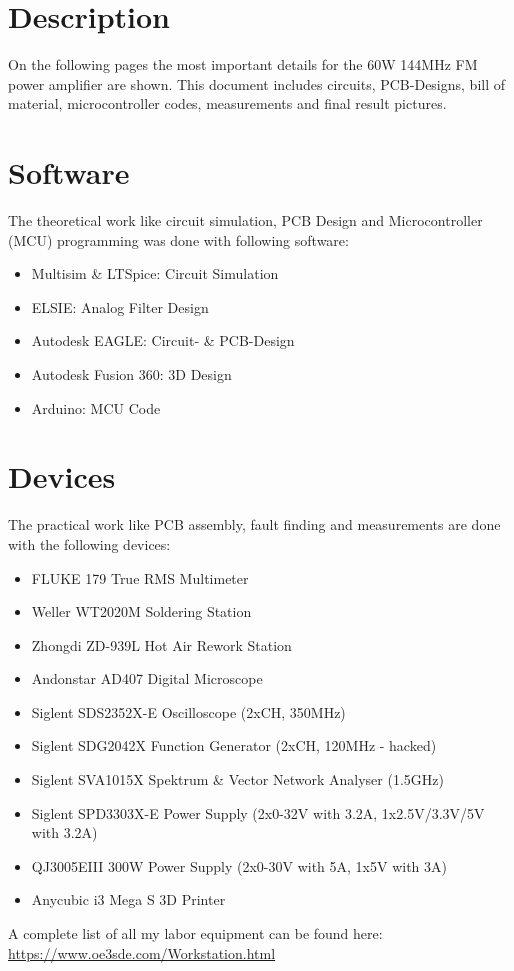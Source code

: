 \section{Description}
On the following pages the most important details for the 60W 144MHz FM power amplifier are shown. This document includes circuits, PCB-Designs, bill of material, microcontroller codes, measurements and final result pictures.

\section{Software}
The theoretical work like circuit simulation, PCB Design and Microcontroller (MCU) programming was done with following software:
\begin{itemize}
	\item Multisim \& LTSpice: Circuit Simulation
	\item ELSIE: Analog Filter Design
	\item Autodesk EAGLE: Circuit- \& PCB-Design
	\item Autodesk Fusion 360: 3D Design
	\item Arduino: MCU Code
\end{itemize}
\newpage
\section{Devices}
The practical work like PCB assembly, fault finding and measurements are done with the following devices:
\begin{itemize}
	\item FLUKE 179 True RMS Multimeter
	\item Weller WT2020M Soldering Station
	\item Zhongdi ZD-939L Hot Air Rework Station
	\item Andonstar AD407 Digital Microscope
	\item Siglent SDS2352X-E Oscilloscope (2xCH, 350MHz)
	\item Siglent SDG2042X Function Generator (2xCH, 120MHz - hacked)
	\item Siglent SVA1015X Spektrum \& Vector Network Analyser (1.5GHz)
	\item Siglent SPD3303X-E Power Supply (2x0-32V with 3.2A, 1x2.5V/3.3V/5V with 3.2A)
	\item QJ3005EIII 300W Power Supply (2x0-30V with 5A, 1x5V with 3A)
	\item Anycubic i3 Mega S 3D Printer
\end{itemize}
A complete list of all my labor equipment can be found here: \url{https://www.oe3sde.com/Workstation.html}